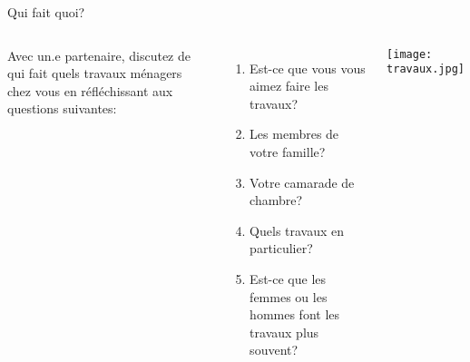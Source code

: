 \begin{frame}{Qui fait quoi?}
  \begin{columns}
      Avec un.e partenaire, discutez de qui fait quels travaux ménagers chez vous en réfléchissant aux questions suivantes:
      \begin{enumerate}
        \item Est-ce que vous vous aimez faire les travaux?
        \item Les membres de votre famille?
        \item Votre camarade de chambre?
        \item Quels travaux en particulier?
        \item Est-ce que les femmes ou les hommes font les travaux plus souvent?
      \end{enumerate}
      \begin{center}
        \texttt{[image: travaux.jpg]}
      \end{center}
  \end{columns}
\end{frame}